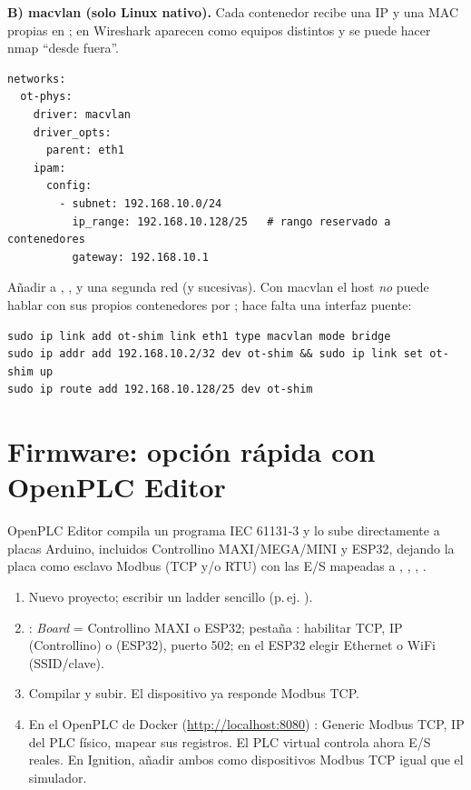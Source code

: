 \textbf{B) macvlan (solo Linux nativo).} Cada contenedor recibe una IP y una MAC propias en ; en Wireshark aparecen como equipos distintos y se puede hacer nmap ``desde fuera''.

\begin{lstlisting}[style=yaml]
networks:
  ot-phys:
    driver: macvlan
    driver_opts:
      parent: eth1
    ipam:
      config:
        - subnet: 192.168.10.0/24
          ip_range: 192.168.10.128/25   # rango reservado a contenedores
          gateway: 192.168.10.1
\end{lstlisting}

Añadir a , ,  y  una segunda red  (y sucesivas). Con macvlan el host \emph{no} puede hablar con sus propios contenedores por ; hace falta una interfaz puente:

\begin{lstlisting}[style=bash]
sudo ip link add ot-shim link eth1 type macvlan mode bridge
sudo ip addr add 192.168.10.2/32 dev ot-shim && sudo ip link set ot-shim up
sudo ip route add 192.168.10.128/25 dev ot-shim
\end{lstlisting}

\section{Firmware: opción rápida con OpenPLC Editor}

OpenPLC Editor compila un programa IEC 61131-3 y lo sube directamente a placas Arduino, incluidos Controllino MAXI/MEGA/MINI y ESP32, dejando la placa como esclavo Modbus (TCP y/o RTU) con las E/S mapeadas a , , , .

\begin{enumerate}
  \item Nuevo proyecto; escribir un ladder sencillo (p.\,ej. ).
  \item {}: \emph{Board} = Controllino MAXI o ESP32; pestaña : habilitar TCP, IP  (Controllino) o  (ESP32), puerto 502; en el ESP32 elegir Ethernet o WiFi (SSID/clave).
  \item Compilar y subir. El dispositivo ya responde Modbus TCP.
  \item En el OpenPLC de Docker (\url{http://localhost:8080}) : Generic Modbus TCP, IP del PLC físico, mapear sus registros. El PLC virtual controla ahora E/S reales. En Ignition, añadir ambos como dispositivos Modbus TCP igual que el simulador.
\end{enumerate}


